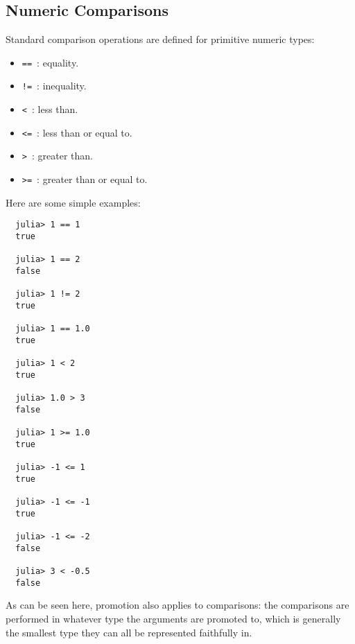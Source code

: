 \documentclass{article}
\begin{document}
\subsection{Numeric Comparisons}

Standard comparison operations are defined for primitive numeric types:
\begin{itemize}
  \item \verb|==|~: equality.
  \item \verb|!=|~: inequality.
  \item \verb|<|~: less than.
  \item \verb|<=|~: less than or equal to.
  \item \verb|>|~: greater than.
  \item \verb|>=|~: greater than or equal to.
\end{itemize}
Here are some simple examples:
\begin{verbatim}
  julia> 1 == 1
  true

  julia> 1 == 2
  false

  julia> 1 != 2
  true
  
  julia> 1 == 1.0
  true

  julia> 1 < 2
  true

  julia> 1.0 > 3
  false

  julia> 1 >= 1.0
  true

  julia> -1 <= 1
  true

  julia> -1 <= -1
  true

  julia> -1 <= -2
  false

  julia> 3 < -0.5
  false
\end{verbatim}
As can be seen here, promotion also applies to comparisons:
the comparisons are performed in whatever type the arguments are promoted to, which is generally the smallest type they can all be represented faithfully in.
\end{document}
